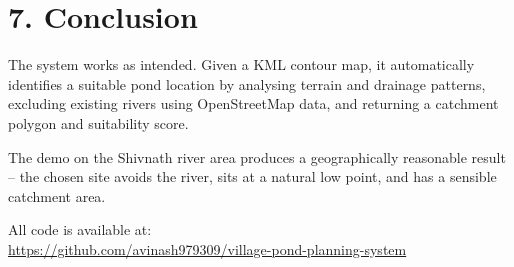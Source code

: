 \documentclass[12pt,a4paper]{article}
\begin{document}
\section*{7. Conclusion}

The system works as intended. Given a KML contour map, it automatically
identifies a suitable pond location by analysing terrain and drainage patterns,
excluding existing rivers using OpenStreetMap data, and returning a catchment
polygon and suitability score.

The demo on the Shivnath river area produces a geographically reasonable
result -- the chosen site avoids the river, sits at a natural low point, and
has a sensible catchment area.

All code is available at:\\
\url{https://github.com/avinash979309/village-pond-planning-system}
\end{document}
